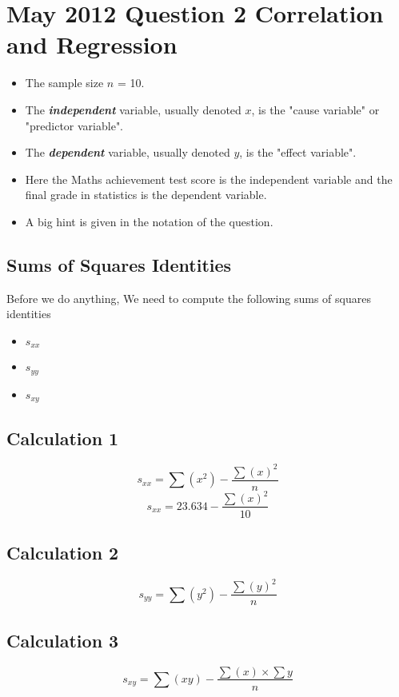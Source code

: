 \documentclass[]{report}
\begin{document}
\newpage

\section*{May 2012 Question 2 Correlation and Regression}
\begin{itemize}
	\item The sample size $n$ = 10.
	\item The \textbf{\textit{independent}} variable, usually denoted $x$, is the "cause variable" or "predictor variable".
	\item The \textbf{\textit{dependent}} variable, usually denoted $y$, is the "effect variable".
	\item Here the Maths achievement test score is the independent variable and the final grade in statistics is the dependent variable.
	\item A big hint is given in the notation of the question.
\end{itemize}


\subsection*{Sums of Squares Identities}
Before we do anything, We need to compute the following sums of squares identities
\begin{itemize}
	\item $s_{xx}$
	\item $s_{yy}$
	\item $s_{xy}$
\end{itemize}
\subsection*{Calculation 1}
\[ s_{xx}  = \sum(x^2) - \frac{\sum(x)^2}{n} \]
\[ s_{xx}  = 23.634 - \frac{\sum(x)^2}{10} \]

\subsection*{Calculation 2}
\[ s_{yy}  = \sum(y^2) - \frac{\sum(y)^2}{n} \]


\subsection*{Calculation 3}
\[ s_{xy}  = \sum(xy) - \frac{\sum(x)\times \sum{y}}{n} \]
\end{document}

